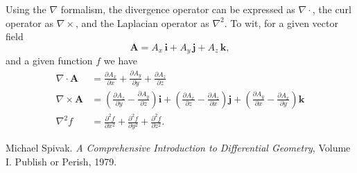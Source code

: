 \documentclass[12pt]{article}
\newcommand{\lp}{\left(}
\newcommand{\rp}{\right)}
\newcommand{\vi}{\mathbf{i}}
\newcommand{\vj}{\mathbf{j}}
\newcommand{\vk}{\mathbf{k}}
\newcommand{\vA}{\mathbf{A}}
\begin{document}
Using the $\nabla$ formalism,
the divergence operator can be expressed as
$\nabla\cdot$, the curl operator as $\nabla\times$, and the
Laplacian operator as $\nabla^2$. To wit, for a given vector field
$$\vA = A_x\, \vi + A_y\, \vj + A_z\, \vk,$$ and a given function $f$
we have
\begin{align*}
\nabla\cdot \vA &= \frac{\partial A_x}{\partial x} +
\frac{\partial A_y}{\partial y} +\frac{\partial A_z}{\partial z} \\
\nabla\times \vA &=
\lp\frac{\partial A_z}{\partial y} - \frac{\partial A_y}{\partial z}
\rp \vi+
\lp \frac{\partial A_x}{\partial z} -
\frac{\partial A_z}{\partial x}\rp \vj+
\lp \frac{\partial A_y}{\partial x} -
\frac{\partial A_x}{\partial y}\rp \vk\\
\nabla^2 f &= \frac{\partial^2 f}{\partial x^2} +
\frac{\partial^2 f}{\partial y^2} +\frac{\partial^2 f}{\partial z^2}.
\end{align*}

\begin{thebibliography}{3}
Michael Spivak. \emph{A Comprehensive Introduction to Differential Geometry},
Volume I. Publish or Perish, 1979.
\end{thebibliography}
\end{document}
